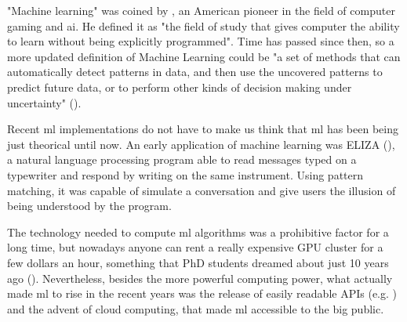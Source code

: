 "Machine learning" was coined by \cite{ml_first_def}, an American pioneer in the field of computer gaming and \gls{ai}. He defined it as "the field of study that gives computer the ability to learn without being explicitly programmed". Time has passed since then, so a more updated definition of Machine Learning could be "a set of methods that can automatically detect patterns in data, and then use the uncovered patterns to predict future
data, or to perform other kinds of decision making under uncertainty" (\cite{kevin_p_murphy_book}).

Recent \gls{ml} implementations do not have to make us think that \gls{ml} has been being just theorical until now. An early application of machine learning was ELIZA (\cite{eliza_machine}), a natural language processing program able to read messages typed on a typewriter and respond by writing on the same instrument. Using pattern matching, it was capable of simulate a conversation and give users the illusion of being understood by the program.  

The technology needed to compute \gls{ml} algorithms was a prohibitive factor for a long time, but nowadays anyone can rent a really expensive GPU cluster for a few dollars an hour, something that PhD students dreamed about just 10 years ago (\cite{pyhton_n_intro_to_ML}). Nevertheless, besides the more powerful computing power, what actually made \gls{ml} to rise in the recent years was the release of easily readable APIs (e.g. \cite{tensorflow_main_website}) and the advent of cloud computing, that made \gls{ml} accessible to the big public.

